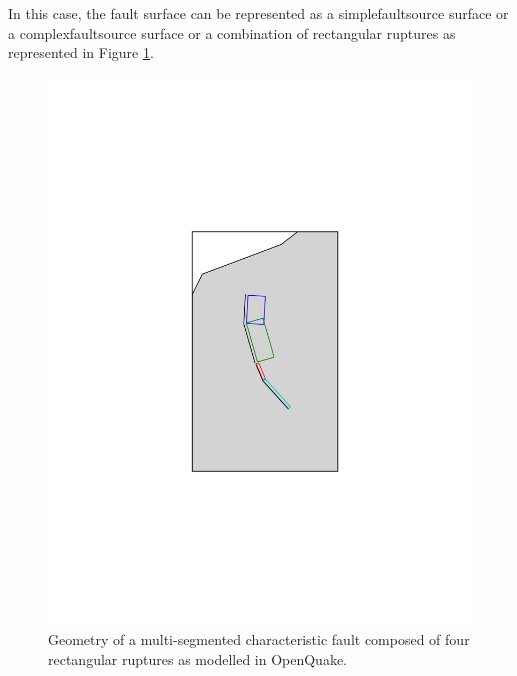 In this case, the fault surface can be represented as a 
\gls{simplefaultsource} surface or a \gls{complexfaultsource} 
surface or a combination of rectangular ruptures as represented 
in Figure \ref{fig:char_fault_source}.
\begin{figure}[!ht]
\centering
\includegraphics[width=15cm]{./figures/hazard/multi_surface.pdf}
\caption{Geometry of a multi-segmented characteristic fault composed of four
	rectangular ruptures as modelled in OpenQuake.}
\label{fig:char_fault_source}
\end{figure}
%
